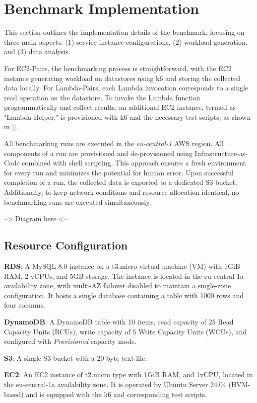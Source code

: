 \section{Benchmark Implementation}
\label{cha:implementation}

This section outlines the implementation details of the benchmark, focusing on three main aspects: (1) service instance configurations, (2) workload generation, and (3) data analysis.

For EC2-Pairs, the benchmarking process is straightforward, with the EC2 instance generating workload on datastores using k6 and storing the collected data locally. For Lambda-Pairs, each Lambda invocation corresponds to a single read operation on the datastore. To invoke the Lambda function programmatically and collect results, an additional EC2 instance, termed as "Lambda-Helper," is provisioned with k6 and the necessary test scripts, as shown in \ref{}.

All benchmarking runs are executed in the \textit{eu-central-1} AWS region. All components of a run are provisioned and de-provisioned using Infrastructure-as-Code  combined with shell scripting. This approach ensures a fresh environment for every run and minimizes the potential for human error. Upon successful completion of a run, the collected data is exported to a dedicated S3 bucket. Additionally, to keep network conditions and resource allocation identical, no benchmarking runs are executed simultaneously.

--> Diagram here <--

\subsection{Resource Configuration}
\label{sec:config}

\textbf{RDS}:
A MySQL 8.0 instance on a t3.micro virtual machine (VM) with 1GiB RAM, 2 vCPUs, and 5GB storage. The instance is located in the eu-central-1a availability zone, with multi-AZ failover disabled to maintain a single-zone configuration. It hosts a single database containing a table with 1000 rows and four columns.


\textbf{DynamoDB}:
A DynamoDB table with 10 items, read capacity of 25 Read Capacity Units (RCUs), write capacity of 5 Write Capacity Units (WCUs), and configured with \textit{Provisioned} capacity mode.

\textbf{S3}:
A single S3 bucket with a 20-byte text file.

\textbf{EC2}:
An EC2 instance of t2.micro type with 1GiB RAM, and 1vCPU, located in the eu-central-1a availability zone. It is operated by Ubuntu Server 24.04 (HVM-based) and is equipped with the k6 and corresponding test scripts.

